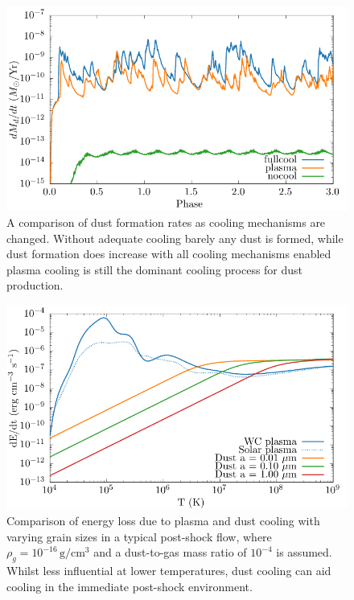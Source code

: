 \documentclass[fleqn,usenatbib]{mnras}
\begin{document}
\begin{figure}
  \centering
  \includegraphics[width=\linewidth]{assets/cool-phase-dust_rate.pdf}
  \caption[Comparison of dust formation rates with cooling methods]{A comparison of dust formation rates as cooling mechanisms are changed. Without adequate cooling barely any dust is formed, while dust formation does increase with all cooling mechanisms enabled plasma cooling is still the dominant cooling process for dust production.}
  \label{fig:coolingprocess-dustproduction}
\end{figure}

\begin{figure}
  \centering
  \includegraphics[width=\linewidth]{assets/dust-plasma-cooling-comparison/cooling-comparison-forpaper2.pdf}
  \caption[Comparison of dust and plasma cooling rates in post-shock environment]{Comparison of energy loss due to plasma and dust cooling with varying grain sizes in a typical post-shock flow, where $\rho_g = 10^{-16} \, \si{\gram\per\centi\metre\cubed}$ and a dust-to-gas mass ratio of $10^{-4}$ is assumed. Whilst less influential at lower temperatures, dust cooling can aid cooling in the immediate post-shock environment.}
  \label{fig:postshockcoolcomparison}
\end{figure}
\end{document}
